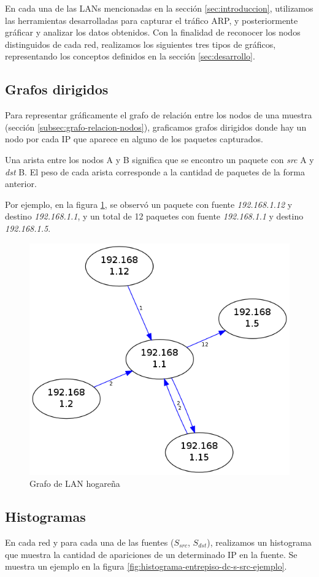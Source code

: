 En cada una de las LANs mencionadas en la sección \ref{sec:introduccion}, utilizamos las herramientas desarrolladas para capturar el tráfico ARP, y posteriormente gráficar y analizar los datos obtenidos. Con la finalidad de reconocer los nodos distinguidos de cada red, realizamos los siguientes tres tipos de gráficos, representando los conceptos definidos en la sección \ref{sec:desarrollo}.

\subsection{Grafos dirigidos}

  Para representar gráficamente el grafo de relación entre los nodos de una muestra (sección \ref{subsec:grafo-relacion-nodos}), graficamos grafos dirigidos donde hay un nodo por cada IP que aparece en alguno de los paquetes capturados.
 
  Una arista entre los nodos A y B significa que se encontro un paquete con \emph{src} A y \emph{dst} B. El peso de cada arista corresponde a la cantidad de paquetes de la forma anterior.
  
  Por ejemplo, en la figura \ref{fig:FedeGrafo-ejemplo}, se observó un paquete con fuente \emph{192.168.1.12} y destino \emph{192.168.1.1}, y un total de 12 paquetes con fuente \emph{192.168.1.1} y destino \emph{192.168.1.5}.
  
  \begin{figure}[H]
  \begin{center}
    \includegraphics[width=0.3\linewidth]{../imgs/red-hogarena_red.png}
    \caption{Grafo de LAN hogareña}
    \label{fig:FedeGrafo-ejemplo}
  \end{center}
\end{figure}

\subsection{Histogramas}

  En cada red y para cada una de las fuentes ($S_{src}$, $S_{dst}$), realizamos un histograma que muestra la cantidad de apariciones de un determinado IP en la fuente. Se muestra un ejemplo en la figura \ref{fig:histograma-entrepiso-dc-s-src-ejemplo}.
  
